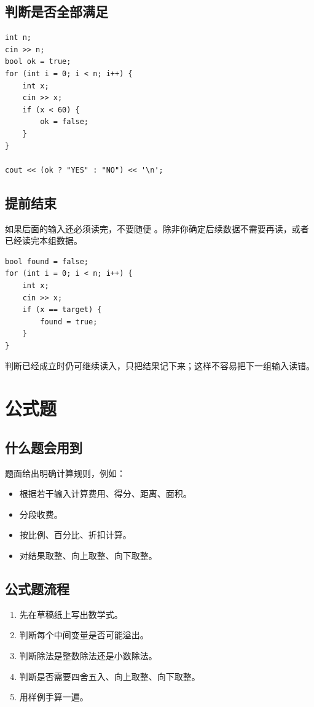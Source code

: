 \subsection{判断是否全部满足}

\begin{lstlisting}
int n;
cin >> n;
bool ok = true;
for (int i = 0; i < n; i++) {
    int x;
    cin >> x;
    if (x < 60) {
        ok = false;
    }
}

cout << (ok ? "YES" : "NO") << '\n';
\end{lstlisting}

\subsection{提前结束}

如果后面的输入还必须读完，不要随便 。除非你确定后续数据不需要再读，或者已经读完本组数据。

\begin{lstlisting}
bool found = false;
for (int i = 0; i < n; i++) {
    int x;
    cin >> x;
    if (x == target) {
        found = true;
    }
}
\end{lstlisting}

判断已经成立时仍可继续读入，只把结果记下来；这样不容易把下一组输入读错。

\section{公式题}\label{sec:05-10}

\subsection{什么题会用到}

题面给出明确计算规则，例如：

\begin{itemize}
  \item 根据若干输入计算费用、得分、距离、面积。
  \item 分段收费。
  \item 按比例、百分比、折扣计算。
  \item 对结果取整、向上取整、向下取整。
\end{itemize}

\subsection{公式题流程}

\begin{enumerate}
  \item 先在草稿纸上写出数学式。
  \item 判断每个中间变量是否可能溢出。
  \item 判断除法是整数除法还是小数除法。
  \item 判断是否需要四舍五入、向上取整、向下取整。
  \item 用样例手算一遍。
\end{enumerate}

